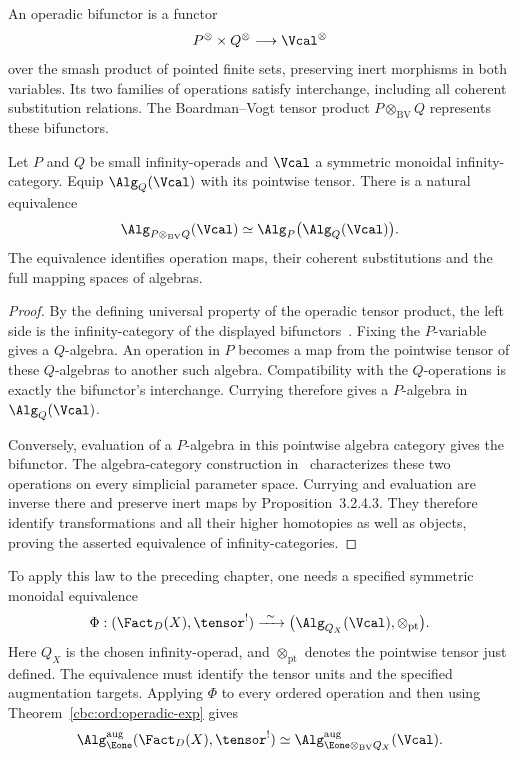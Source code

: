 An operadic bifunctor is a functor
\[
 P^\otimes\times Q^\otimes\longrightarrow\Vcal^\otimes
\]
over the smash product of pointed finite sets, preserving inert morphisms in both variables. Its two families of operations satisfy interchange, including all coherent substitution relations. The Boardman--Vogt tensor product $P\otimes_{\mathrm{BV}}Q$ represents these bifunctors.

\begin{theorem}\label{cbc:ord:operadic-exp}
Let $P$ and $Q$ be small infinity-operads and $\Vcal$ a symmetric monoidal infinity-category. Equip $\Alg_Q(\Vcal)$ with its pointwise tensor. There is a natural equivalence
\[
 \Alg_{P\otimes_{\mathrm{BV}}Q}(\Vcal)
 \simeq
 \Alg_P\bigl(\Alg_Q(\Vcal)\bigr).
\]
The equivalence identifies operation maps, their coherent substitutions and the full mapping spaces of algebras.
\end{theorem}
\begin{proof}
By the defining universal property of the operadic tensor product, the left side is the infinity-category of the displayed bifunctors~\cite[Definition~2.2.5.3]{LurieHA}. Fixing the $P$-variable gives a $Q$-algebra. An operation in $P$ becomes a map from the pointwise tensor of these $Q$-algebras to another such algebra. Compatibility with the $Q$-operations is exactly the bifunctor's interchange. Currying therefore gives a $P$-algebra in $\Alg_Q(\Vcal)$.

Conversely, evaluation of a $P$-algebra in this pointwise algebra category gives the bifunctor. The algebra-category construction in~\cite[Construction~3.2.4.1]{LurieHA} characterizes these two operations on every simplicial parameter space. Currying and evaluation are inverse there and preserve inert maps by Proposition~3.2.4.3. They therefore identify transformations and all their higher homotopies as well as objects, proving the asserted equivalence of infinity-categories.
\end{proof}

To apply this law to the preceding chapter, one needs a specified symmetric monoidal equivalence
\begin{equation}\label{cbc:ord:operadic-comparison}
 \Phi:(\Fact_D(X),\tensor^!)
 \xrightarrow{\ \sim\ }
 \bigl(\Alg_{Q_X}(\Vcal),\otimes_{\mathrm{pt}}\bigr).
\end{equation}
Here $Q_X$ is the chosen infinity-operad, and $\otimes_{\mathrm{pt}}$ denotes the pointwise tensor just defined. The equivalence must identify the tensor units and the specified augmentation targets. Applying $\Phi$ to every ordered operation and then using Theorem~\ref{cbc:ord:operadic-exp} gives
\begin{equation}\label{cbc:ord:operadic-ordered}
 \Alg_{\Eone}^{\mathrm{aug}}(\Fact_D(X),\tensor^!)
 \simeq
 \Alg_{\Eone\otimes_{\mathrm{BV}}Q_X}^{\mathrm{aug}}(\Vcal).
\end{equation}

